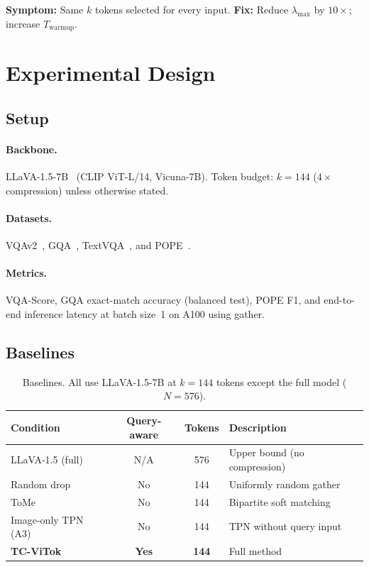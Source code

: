 \documentclass[11pt,a4paper]{article}
\begin{document}
\begin{warnbox}[title={Failure Mode 3: Degenerate Fixed Mask}]
\textbf{Symptom:} Same $k$ tokens selected for every input.
\textbf{Fix:} Reduce $\lambda_{\max}$ by $10\times$; increase
$T_{\mathrm{warmup}}$.
\end{warnbox}

\section{Experimental Design}
\label{sec:experiments}

\subsection{Setup}

\paragraph{Backbone.}
LLaVA-1.5-7B~\citep{liu2024llava} (CLIP ViT-L/14, Vicuna-7B).
Token budget: $k{=}144$ ($4\times$ compression) unless otherwise stated.

\paragraph{Datasets.}
VQAv2~\citep{goyal2017vqa}, GQA~\citep{hudson2019gqa}, TextVQA~\citep{singh2019textvqa}, and
POPE~\citep{pope}.

\paragraph{Metrics.}
VQA-Score, GQA exact-match accuracy (balanced test), POPE F1, and
end-to-end inference latency at batch size~1 on A100 using gather.

\subsection{Baselines}

\begin{table}[h]
\centering
\caption{Baselines. All use LLaVA-1.5-7B at $k{=}144$ tokens except the
full model ($N{=}576$).}
\label{tab:baselines}
\renewcommand{\arraystretch}{1.15}
\small
\begin{tabular}{@{}lccp{5.5cm}@{}}
  \toprule
  Condition & Query-aware & Tokens & Description \\
  \midrule
  LLaVA-1.5 (full)   & N/A & 576 & Upper bound (no compression) \\
  Random drop         & No  & 144 & Uniformly random gather \\
  ToMe~\citep{bolya2022token} & No & 144 & Bipartite soft matching \\
  Image-only TPN (A3) & No  & 144 & TPN without query input \\
  \textbf{TC-ViTok}   & \textbf{Yes} & \textbf{144} & Full method \\
  \bottomrule
\end{tabular}
\end{table}
\end{document}
